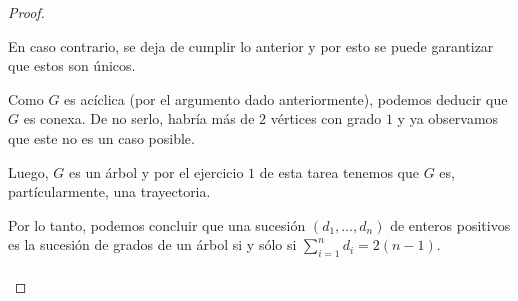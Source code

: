 \documentclass{article}
\begin{document}
\begin{enumerate}
\begin{proof}
\begin{itemize}
            En caso contrario, se deja de cumplir lo anterior y por esto
            se puede garantizar que estos son \'unicos.

            Como $G$ es ac\'iclica (por el argumento dado anteriormente), podemos
            deducir que $G$ es conexa. De no serlo, habr\'ia m\'as de $2$
            v\'ertices con grado $1$ y ya observamos que este no es un caso posible.

            Luego, $G$ es un \'arbol y por el ejercicio $1$ de esta tarea tenemos
            que $G$ es, part\'icularmente, una trayectoria.
        \end{itemize}
        Por lo tanto, podemos concluir que una sucesi\'on $(d_1, \dots,
        d_n)$ de enteros positivos es la sucesi\'on de grados de un \'arbol
        si y s\'olo si $\displaystyle \sum_{i=1}^n d_i = 2(n-1)$. \\
        \\
      \end{proof}
  \end{enumerate}

\end{document}
